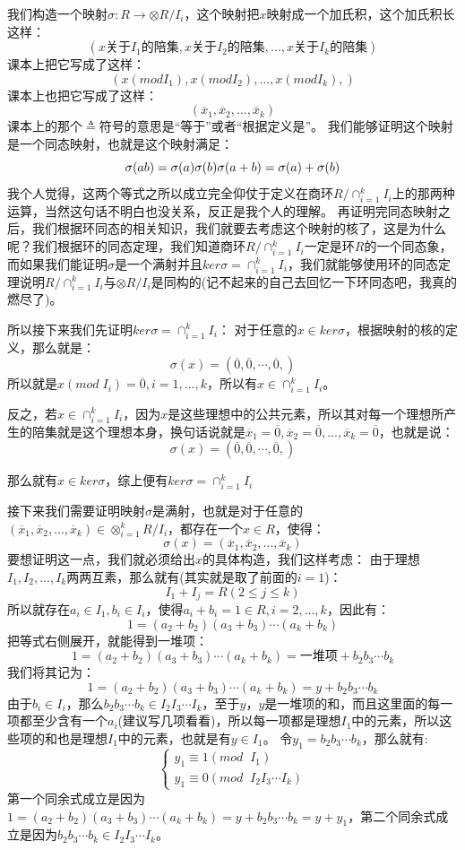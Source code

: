\documentclass[12pt, a4paper, oneside]{ctexart}
\begin{document}
我们构造一个映射$\sigma:R\rightarrow \otimes R/I_i$，这个映射把$x$映射成一个加氏积，这个加氏积长这样：
\[
(x关于I_1的陪集,x关于I_2的陪集,...,x关于I_k的陪集)
\]
课本上把它写成了这样：
\[
(x(mod I_1),x(mod I_2),...,x(mod I_k),)
\]
课本上也把它写成了这样：
\[
(\overline{x}_1,\overline{x}_2,...,\overline{x}_k)
\]
课本上的那个$\triangleq$符号的意思是“等于”或者“根据定义是”。
我们能够证明这个映射是一个同态映射，也就是这个映射满足：
\[
\sigma(ab)=\sigma(a)\sigma(b)\\
\sigma(a+b)=\sigma(a)+\sigma(b)
\]
我个人觉得，这两个等式之所以成立完全仰仗于定义在商环$R/\cap_{i=1}^k I_i$上的那两种运算，当然这句话不明白也没关系，反正是我个人的理解。
再证明完同态映射之后，我们根据环同态的相关知识，我们就要去考虑这个映射的核了，这是为什么呢？我们根据环的同态定理，我们知道商环$R/\cap_{i=1}^k I_i$一定是环$R$的一个同态象，而如果我们能证明$\sigma$是一个满射并且$ker\sigma= \cap_{i=1}^k I_i$，我们就能够使用环的同态定理说明$R/\cap_{i=1}^k I_i$与$\otimes R/I_i$是同构的(记不起来的自己去回忆一下环同态吧，我真的燃尽了)。

所以接下来我们先证明$ker \sigma=\cap_{i=1}^k I_i$：
对于任意的$x\in ker\sigma$，根据映射的核的定义，那么就是：
\[
\sigma(x)=(\overline{0},\overline{0},\cdots,\overline{0},)
\]
所以就是$x(mod\; I_i)=\overline{0},i=1,...,k$，所以有$x\in \cap_{i=1}^k I_i$。

反之，若$x\in \cap_{i=1}^k I_i$，因为$x$是这些理想中的公共元素，所以其对每一个理想所产生的陪集就是这个理想本身，换句话说就是$\overline{x}_1=\overline{0},\overline{x}_2=\overline{0},...,\overline{x}_k=\overline{0}$，也就是说：
\[
\sigma(x)=(\overline{0},\overline{0},\cdots,\overline{0},)
\]

那么就有$x\in ker\sigma$，综上便有$ker\sigma=\cap_{i=1}^k I_i$

接下来我们需要证明映射$\sigma$是满射，也就是对于任意的$(\overline{x}_1,\overline{x}_2,...,\overline{x}_k)\in \otimes_{i=1}^k R/I_i$，都存在一个$x\in R$，使得：
\[
\sigma(x)=(\overline{x}_1,\overline{x}_2,...,\overline{x}_k)
\]
要想证明这一点，我们就必须给出$x$的具体构造，我们这样考虑：
由于理想$I_1,I_2,...,I_k$两两互素，那么就有(其实就是取了前面的$i=1$)：
\[
I_1+I_j=R(2\leqslant j\leqslant k)
\]
​	所以就存在$a_i\in I_1,b_i\in I_i$，使得$a_i+b_i=1\in R,i=2,...,k$，因此有：
\[
1=(a_2+b_2)(a_3+b_3)\cdots(a_k+b_k)
\]
把等式右侧展开，就能得到一堆项：
\[
1=(a_2+b_2)(a_3+b_3)\cdots(a_k+b_k)=一堆项+b_2b_3\cdots b_k
\]
我们将其记为：
\[
1=(a_2+b_2)(a_3+b_3)\cdots(a_k+b_k)=y+b_2b_3\cdots b_k
\]
由于$b_i\in I_i$，那么$b_2b_3\cdots b_k\in I_2I_3\cdots I_k$，至于$y$，$y$是一堆项的和，而且这里面的每一项都至少含有一个$a_i$(建议写几项看看)，所以每一项都是理想$I_1$中的元素，所以这些项的和也是理想$I_1$中的元素，也就是有$y\in I_1$。
令$y_1=b_2b_3\cdots b_k$，那么就有:
\[
\begin{cases}
y_1\equiv 1(mod\;\; I_1)\\
y_1\equiv 0(mod\;\; I_2I_3\cdots I_k )
\end{cases}
\]
第一个同余式成立是因为$1=(a_2+b_2)(a_3+b_3)\cdots(a_k+b_k)=y+b_2b_3\cdots b_k=y+y_1$，第二个同余式成立是因为$b_2b_3\cdots b_k\in I_2I_3\cdots I_k$。
\end{document}
